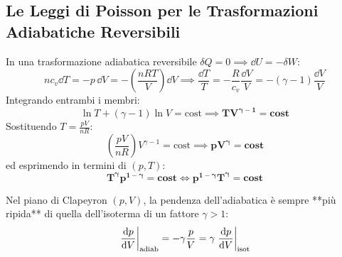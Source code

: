 \subsection{Le Leggi di Poisson per le Trasformazioni Adiabatiche Reversibili}

In una trasformazione adiabatica reversibile $\delta Q = 0 \implies \dd U = -\delta W$:
\begin{equation}
    n c_v \dd T = -p\,\dd V = -\left(\frac{n R T}{V}\right)\dd V \implies \frac{\dd T}{T} = -\frac{R}{c_v}\frac{\dd V}{V} = -(\gamma - 1)\frac{\dd V}{V}
\end{equation}
Integrando entrambi i membri:
\begin{equation}
    \ln T + (\gamma - 1)\ln V = \text{cost} \implies \mathbf{T V^{\gamma - 1} = \text{cost}}
    \label{eq:poisson_tv}
\end{equation}
Sostituendo $T = \frac{p V}{n R}$:
\begin{equation}
    \left(\frac{p V}{n R}\right) V^{\gamma - 1} = \text{cost} \implies \mathbf{p V^\gamma = \text{cost}}
    \label{eq:poisson_pv}
\end{equation}
ed esprimendo in termini di $(p, T)$:
\begin{equation}
    \mathbf{T^\gamma p^{1 - \gamma} = \text{cost} \iff p^{1 - \gamma} T^\gamma = \text{cost}}
    \label{eq:poisson_tp}
\end{equation}

\begin{esame}
Nel piano di Clapeyron $(p, V)$, la pendenza dell'adiabatica è sempre **più ripida** di quella dell'isoterma di un fattore $\gamma > 1$:
\begin{equation}
    \left.\frac{\mathrm{d} p}{\mathrm{d} V}\right|_{\text{adiab}} = -\gamma \frac{p}{V} = \gamma \left.\frac{\mathrm{d} p}{\mathrm{d} V}\right|_{\text{isot}}
\end{equation}
\end{esame}
